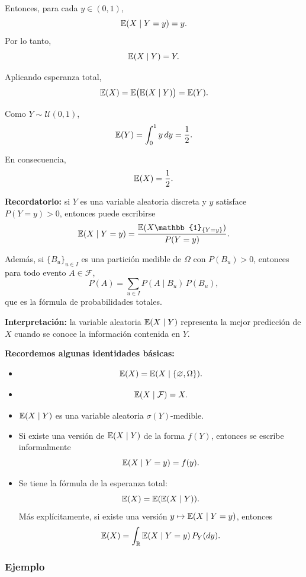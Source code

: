Entonces, para cada \(y\in(0,1)\),
\[
\mathbb{E}(X\mid Y=y)=y.
\]
Por lo tanto,
\[
\mathbb{E}(X\mid Y)=Y.
\]

Aplicando esperanza total,
\[
\mathbb{E}(X)=\mathbb{E}\big(\mathbb{E}(X\mid Y)\big)=\mathbb{E}(Y).
\]

Como \(Y\sim \mathcal{U}(0,1)\),
\[
\mathbb{E}(Y)=\int_0^1 y\,dy=\frac12.
\]

En consecuencia,
\[
\mathbb{E}(X)=\frac12.
\] 

\medskip

\noindent
\textbf{Recordatorio:} si \(Y\) es una variable aleatoria discreta y \(y\) satisface \(P(Y=y)>0\), entonces puede escribirse
\[
\E(X\mid Y=y)
=
\frac{\E(X\mathbb{1}_{\{Y=y\}})}{P(Y=y)}.
\]

\medskip

\noindent
Además, si \(\{B_u\}_{u\in I}\) es una partición medible de \(\Omega\) con \(P(B_u)>0\), entonces para todo evento \(A\in\mathcal{F}\),
\[
P(A)=\sum_{u\in I} P(A\mid B_u)\,P(B_u),
\]
que es la fórmula de probabilidades totales.

\medskip

\noindent
\textbf{Interpretación:} la variable aleatoria \(\mathbb{E}(X\mid Y)\) representa la mejor predicción de \(X\) cuando se conoce la información contenida en \(Y\).

\medskip

\noindent
\textbf{Recordemos algunas identidades básicas:}
\begin{itemize}
\item[(1)] 
\[
\mathbb{E}(X)=\mathbb{E}(X\mid \{\varnothing,\Omega\}).
\]

\item[(2)] 
\[
\mathbb{E}(X\mid \mathcal{F})=X.
\]

\item[(3)] \(\mathbb{E}(X\mid Y)\) es una variable aleatoria \(\sigma(Y)\)-medible.

\item[(4)] Si existe una versión de \(\mathbb{E}(X\mid Y)\) de la forma \(f(Y)\), entonces se escribe informalmente
\[
\mathbb{E}(X\mid Y=y)=f(y).
\]

\item[(5)] Se tiene la fórmula de la esperanza total:
\[
\mathbb{E}(X)=\mathbb{E}(\mathbb{E}(X\mid Y)).
\]
Más explícitamente, si existe una versión \(y\mapsto \mathbb{E}(X\mid Y=y)\), entonces
\[
\mathbb{E}(X)=\int_{\mathbb{R}} \mathbb{E}(X\mid Y=y)\,P_Y(dy).
\]
\end{itemize}

\subsubsection*{Ejemplo}

